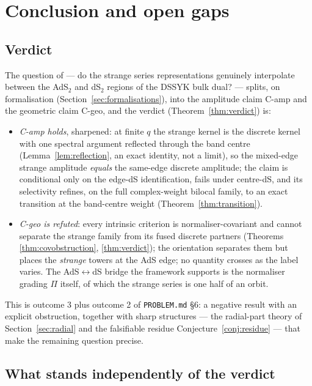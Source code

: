 \documentclass[11pt,a4paper]{article}
\theoremstyle{definition}
\theoremstyle{plain}
\begin{document}
\section{Conclusion and open gaps}
\label{sec:conclusion}


\subsection{Verdict}

The question of \cite{Schouten:2025dssyk} --- do the strange series representations
genuinely interpolate between the AdS$_2$ and dS$_2$ regions of the DSSYK bulk dual? ---
splits, on formalisation (Section~\ref{sec:formalisations}), into the amplitude claim
C-amp and the geometric claim C-geo, and the verdict (Theorem~\ref{thm:verdict}) is:

\begin{itemize}
\item \emph{C-amp holds}, sharpened: at finite $q$ the strange kernel is the discrete
kernel with one spectral argument reflected through the band centre
(Lemma~\ref{lem:reflection}, an exact identity, not a limit), so the mixed-edge strange
amplitude \emph{equals} the same-edge discrete amplitude; the claim is conditional only on
the edge-dS identification, fails under centre-dS, and its selectivity refines, on the
full complex-weight bilocal family, to an exact transition at the band-centre weight
(Theorem~\ref{thm:transition}).
\item \emph{C-geo is refuted}: every intrinsic criterion is normaliser-covariant and
cannot separate the strange family from its fused discrete partners
(Theorems \ref{thm:covobstruction}, \ref{thm:verdict}); the orientation separates them
but places the \emph{strange} towers at the AdS edge; no quantity crosses as the label
varies. The AdS$\leftrightarrow$dS bridge the framework supports is the normaliser
grading $\Pi$ itself, of which the strange series is one half of an orbit.
\end{itemize}

This is outcome 3 plus outcome 2 of \texttt{PROBLEM.md} \S6: a negative result with an
explicit obstruction, together with sharp structures --- the radial-part theory of
Section~\ref{sec:radial} and the falsifiable residue Conjecture~\ref{conj:residue} ---
that make the remaining question precise.

\subsection{What stands independently of the verdict}
\end{document}
